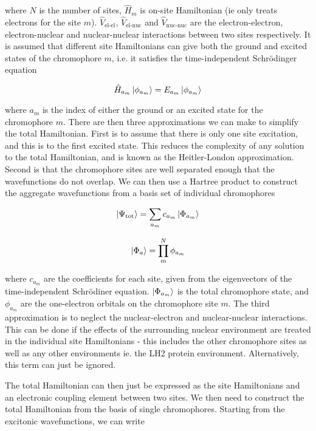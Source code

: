 where $N$ is the number of sites, $\hat{H}_m$ is on-site Hamiltonian (ie only treats
electrons for the site $m$). $\hat{V}_{\text{el-el}}$, $\hat{V}_{\text{el-nuc}}$ 
and $\hat{V}_{\text{nuc-nuc}}$ are the electron-electron, electron-nuclear and nuclear-nuclear
interactions between two sites respectively. It is assumed that different site Hamiltonians
can give both the ground and excited states of the chromophore $m$, i.e. it satisfies
the time-independent Schrödinger equation

\begin{equation}
\hat{H}_{a_m} \ket{\phi_{a_m}} = E_{a_m} \ket{\phi_{a_m}}
\end{equation}

where ${a_m}$ is the index of either the ground or an excited state for the chromophore
$m$. There are then three approximations we can make to simplify the total Hamiltonian.
First is to assume that there is only one site excitation, and this is to the first
excited state. This reduces the complexity of any solution to the total Hamiltonian,
and is known as the Heitler-London approximation\cite{Agranovich2000}. Second is 
that the chromophore sites are well separated enough that the wavefunctions do not
overlap\cite{Frenkel1931}. We can then use a Hartree product to construct the aggregate
wavefunctions from a basis set of individual chromophores

\begin{equation}
\ket{\Psi_\text{tot}} = \sum_{a_m} c_{a_m} \ket{\Phi_{a_m}}
\end{equation}

\begin{equation}
\ket{\Phi_a} = \prod^N_m \phi_{a_m}
\end{equation}

where $c_{a_m}$ are the coefficients for each site, given from the eigenvectors 
of the time-independent Schrödiner equation. $\ket{\Phi_{a_m}}$ is the total chromophore
state, and $\phi_{a_m}$ are the one-electron orbitals on the chromophore site $m$.
The third approximation is to neglect the nuclear-electron and nuclear-nuclear interactions.
This can be done if the effects of the surrounding nuclear environment are treated
in the individual site Hamiltonians\cite{Scholes2003} - this includes the other 
chromophore sites as well as any other environments ie. the LH2 protein environment.
Alternatively, this term can just be ignored.

The total Hamiltonian can then just be expressed as the site Hamiltonians and an 
electronic coupling element between two sites. We then need to construct the total
Hamiltonian from the basis of single chromophores. Starting from the excitonic wavefunctions,
we can write

